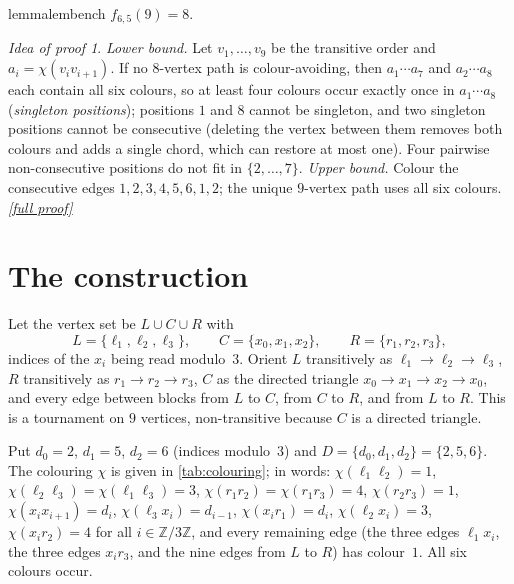 \documentclass[11pt,a4paper]{article}
\theoremstyle{plain}
\theoremstyle{definition}
\theoremstyle{remark}
\newtheorem*{proofidea}{Idea of proof}
\newcommand{\fullproofref}[1]{\,\hyperref[#1]{\textit{[full proof]}}}
\newcommand{\Z}{\mathbb Z}
\newcommand{\col}{\chi}
\newcommand{\lv}{\ell}
\begin{document}
\begin{restatable}{lemma}{lembench}\label{lem:benchmark}
$f_{6,5}(9)=8$.
\end{restatable}
\begin{proofidea}
\emph{Lower bound.} Let $v_1,\dots,v_9$ be the transitive order and $a_i=\col(v_iv_{i+1})$. If no $8$-vertex path is colour-avoiding, then $a_1\cdots a_7$ and $a_2\cdots a_8$ each contain all six colours, so at least four colours occur exactly once in $a_1\cdots a_8$ (\emph{singleton positions}); positions $1$ and $8$ cannot be singleton, and two singleton positions cannot be consecutive (deleting the vertex between them removes both colours and adds a single chord, which can restore at most one). Four pairwise non-consecutive positions do not fit in $\{2,\dots,7\}$.
\emph{Upper bound.} Colour the consecutive edges $1,2,3,4,5,6,1,2$; the unique $9$-vertex path uses all six colours.\fullproofref{pf:benchmark}
\end{proofidea}

\section{The construction}\label{sec:construction}

Let the vertex set be $L\cup C\cup R$ with
\[
 L=\{\lv_1,\lv_2,\lv_3\},\qquad C=\{x_0,x_1,x_2\},\qquad R=\{r_1,r_2,r_3\},
\]
indices of the $x_i$ being read modulo~$3$. Orient $L$ transitively as $\lv_1\to\lv_2\to\lv_3$, $R$ transitively as $r_1\to r_2\to r_3$, $C$ as the directed triangle $x_0\to x_1\to x_2\to x_0$, and every edge between blocks from $L$ to $C$, from $C$ to $R$, and from $L$ to $R$. This is a tournament on $9$ vertices, non-transitive because $C$ is a directed triangle.

Put $d_0=2$, $d_1=5$, $d_2=6$ (indices modulo~$3$) and $D=\{d_0,d_1,d_2\}=\{2,5,6\}$. The colouring $\col$ is given in \cref{tab:colouring}; in words: $\col(\lv_1\lv_2)=1$, $\col(\lv_2\lv_3)=\col(\lv_1\lv_3)=3$, $\col(r_1r_2)=\col(r_1r_3)=4$, $\col(r_2r_3)=1$, $\col(x_ix_{i+1})=d_i$, $\col(\lv_3x_i)=d_{i-1}$, $\col(x_ir_1)=d_i$, $\col(\lv_2x_i)=3$, $\col(x_ir_2)=4$ for all $i\in\Z/3\Z$, and every remaining edge (the three edges $\lv_1x_i$, the three edges $x_ir_3$, and the nine edges from $L$ to $R$) has colour~$1$. All six colours occur.
\end{document}
